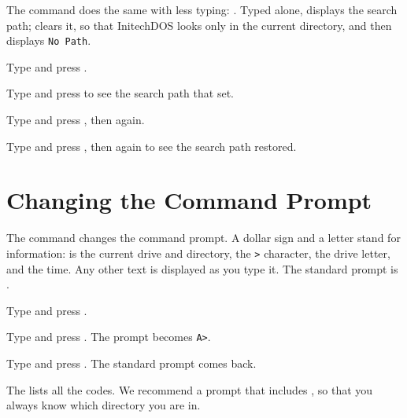 The  command does the same with less typing:
.  Typed alone,  displays the search path;
 clears it, so that InitechDOS looks only in the current
directory, and  then displays \texttt{No Path}.
\begin{Steps}
\item Type  and press .
\item Type  and press  to see the search path that
   set.
\item Type  and press , then  again.
\item Type  and press , then 
  again to see the search path restored.
\end{Steps}


\section{Changing the Command Prompt}
The  command changes the command prompt.  A dollar sign and a
letter stand for information:  is the current drive and directory,
 the \texttt{>} character,  the drive letter, and 
the time.  Any other text is displayed as you type it.  The standard prompt
is .
\begin{Steps}
\item Type  and press .
\item Type  and press .  The prompt becomes
  \texttt{A>}.
\item Type  and press .  The standard prompt comes
  back.
\end{Steps}


The  lists all the \kw{\$} codes.  We
recommend a prompt that includes , so that you always know which
directory you are in.
